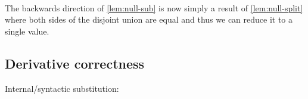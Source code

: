 \begin{lemma}
\begin{code}
\AgdaSymbol{(}\AgdaSpace{}%
\AgdaSymbol{)}\AgdaSpace{}%
\AgdaSymbol{=}\AgdaSpace{}%
\AgdaSpace{}%
\AgdaSymbol{(}\AgdaSpace{}%
\AgdaSymbol{(}\AgdaSpace{}%
\AgdaSpace{}%
\AgdaSymbol{))}\<%
\\
\>[0]\AgdaSpace{}%
\AgdaSymbol{(}\AgdaSpace{}%
\AgdaSymbol{)}\AgdaSpace{}%
\AgdaSpace{}%
\AgdaSymbol{=}\AgdaSpace{}%
\AgdaSpace{}%
\<%
\end{code}
\end{lemma}

The backwards direction of \cref{lem:null-sub} is now simply a result of
\cref{lem:null-split} where both sides of the disjoint union are equal and thus
we can reduce it to a single value.

\begin{code}%
\>[0]\AgdaSpace{}%
\AgdaSpace{}%
\AgdaSpace{}%
\AgdaSymbol{=}\AgdaSpace{}%
\AgdaSpace{}%
\AgdaSymbol{(}\AgdaSpace{}%
\AgdaSymbol{\{}\AgdaSpace{}%
\AgdaSymbol{=}\AgdaSpace{}%
\AgdaSymbol{\}}\AgdaSpace{}%
\AgdaSpace{}%
\AgdaSymbol{)}\<%
\end{code}

\subsection{Derivative correctness}


Internal/syntactic substitution:

